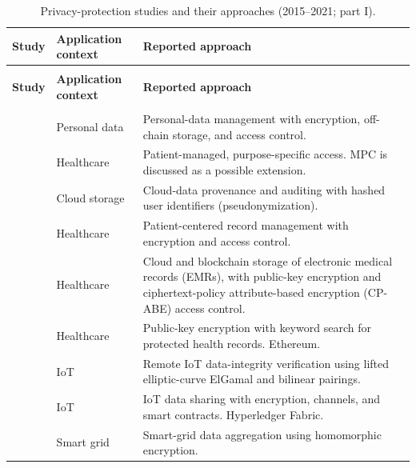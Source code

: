 \begin{longtable}{@{}>{\raggedright\arraybackslash}m{}>{\raggedright\arraybackslash}m{}>{\raggedright\arraybackslash}m{}@{}}
\caption{Privacy-protection studies and their approaches (2015--2021; part I).}\label{tab:privacy-works} \\
\toprule
\textbf{Study} & \textbf{Application context} & \textbf{Reported approach} \\
\midrule
\endfirsthead
\multicolumn{3}{l}{\tablename\ \thetable\ (continued)} \\
\toprule
\textbf{Study} & \textbf{Application context} & \textbf{Reported approach} \\
\midrule
\endhead
\multicolumn{3}{r}{Continued on the next page} \\
\endfoot
\bottomrule
\endlastfoot
\cite{2015-decentralizing-privacy} & Personal data & Personal-data management with encryption, off-chain storage, and access control. \\
\addlinespace[5pt]
\cite{2016-healthcare-data-gateways} & Healthcare & Patient-managed, purpose-specific access. MPC is discussed as a possible extension. \\
\addlinespace[5pt]
\cite{2017-provchain} & Cloud storage & Cloud-data provenance and auditing with hashed user identifiers (pseudonymization). \\
\addlinespace[5pt]
\cite{2017-Medibchain} & Healthcare & Patient-centered record management with encryption and access control. \\
\addlinespace[5pt]
\cite{2018-BPDS} & Healthcare & Cloud and blockchain storage of electronic medical records (EMRs), with public-key encryption and ciphertext-policy attribute-based encryption (CP-ABE) access control. \\
\addlinespace[5pt]
\cite{2018-towards-secure} & Healthcare & Public-key encryption with keyword search for protected health records. Ethereum. \\
\addlinespace[5pt]
\cite{2020-privacy-remote-iot} & IoT & Remote IoT data-integrity verification using lifted elliptic-curve ElGamal and bilinear pairings. \\
\addlinespace[5pt]
\cite{2020-privy-sharing} & IoT & IoT data sharing with encryption, channels, and smart contracts. Hyperledger Fabric. \\
\addlinespace[5pt]
\cite{2021-edge-light-smart-grid} & Smart grid & Smart-grid data aggregation using homomorphic encryption. \\

\end{longtable}

